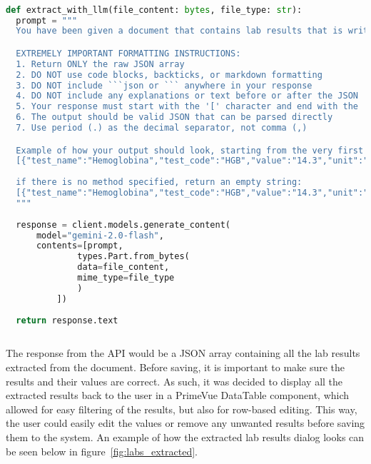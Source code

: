 \begin{lstlisting}[language=Python, caption=Prompt for Lab Results Extraction]

def extract_with_llm(file_content: bytes, file_type: str):
  prompt = """
  You have been given a document that contains lab results that is written in the Romanian language. Your job is to extract all lab results from this document in JSON format with the following fields: test_name, test_code, value, unit, reference_range, method. Sometimes the code of the test will be in the name itself, and it is your job to determine if the code is there, for example in brackets or separated by a comma, and separate the name and the code. Sometimes the lab result will not have a method specified, and in that case you return an empty string. The document is in Romanian, however the JSON keys should be in English.

  EXTREMELY IMPORTANT FORMATTING INSTRUCTIONS:
  1. Return ONLY the raw JSON array
  2. DO NOT use code blocks, backticks, or markdown formatting
  3. DO NOT include ```json or ``` anywhere in your response
  4. DO NOT include any explanations or text before or after the JSON
  5. Your response must start with the '[' character and end with the ']' character
  6. The output should be valid JSON that can be parsed directly
  7. Use period (.) as the decimal separator, not comma (,)

  Example of how your output should look, starting from the very first character:
  [{"test_name":"Hemoglobina","test_code":"HGB","value":"14.3","unit":"mg/dL","reference_range":"13.2-17.3", "method":"Chemiluminiscenta"}]
  
  if there is no method specified, return an empty string:
  [{"test_name":"Hemoglobina","test_code":"HGB","value":"14.3","unit":"mg/dL","reference_range":"13.2-17.3", "method":" "}]
  """
  
  response = client.models.generate_content(
      model="gemini-2.0-flash",
      contents=[prompt,
              types.Part.from_bytes(
              data=file_content, 
              mime_type=file_type
              )
          ])
  
  return response.text
  
\end{lstlisting}

The response from the API would be a JSON array containing all the lab results extracted from the document. Before saving, it is important to make sure the results and their values are correct. As such, it was decided to display all the extracted results back to the user in a PrimeVue DataTable component, which allowed for easy filtering of the results, but also for row-based editing. This way, the user could easily edit the values or remove any unwanted results before saving them to the system. An example of how the extracted lab results dialog looks can be seen below in figure~\ref{fig:labs_extracted}.

